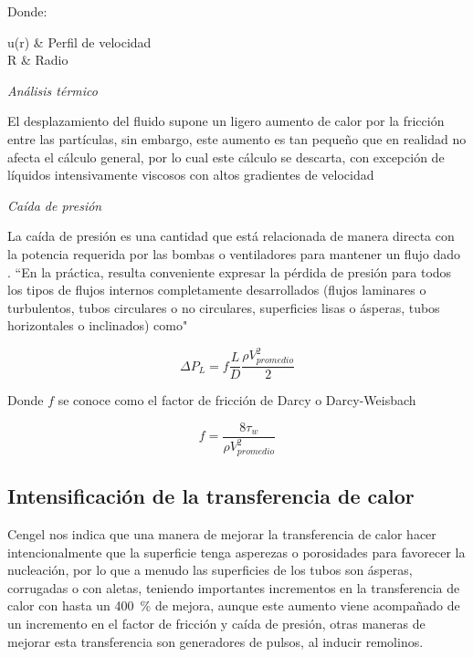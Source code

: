 				Donde:
				\begin{conditions}
					u(r) & Perfil de velocidad \\
					R & Radio
				\end{conditions}
				
				
				{\textit{Análisis térmico}}

				El desplazamiento del fluido supone un ligero aumento de calor por la fricción entre las partículas, sin embargo, este aumento es tan pequeño que en realidad no afecta el cálculo general, por lo cual este cálculo se descarta, con excepción de líquidos intensivamente viscosos con altos gradientes de velocidad

				{\textit{Caída de presión}}

				La caída de presión es una cantidad que está relacionada de manera directa con la potencia requerida por las bombas o ventiladores para mantener un flujo dado \cite{cengel_transferencia_2010}. ``En la práctica, resulta conveniente expresar la pérdida de presión para todos los tipos de flujos internos completamente desarrollados (flujos laminares o turbulentos, tubos circulares o no circulares, superficies lisas o ásperas, tubos horizontales o inclinados) como"

				\begin{equation}
					\label{equ:caida-presion}
					\Delta P_{L} = f\dfrac{L}{D}\dfrac{\rho V_{promedio}^{2}}{2}
				\end{equation}

				Donde $f$ se conoce como el factor de fricción de Darcy o Darcy-Weisbach

				\begin{equation}
					\label{equ:ff-darcy}
					f = \dfrac{8\tau_{w}}{\rho V_{promedio}^{2}}
				\end{equation}

		\subsection{Intensificación de la transferencia de calor}

			Cengel \cite{cengel_transferencia_2010} nos indica que una manera de mejorar la transferencia de calor hacer intencionalmente que la superficie tenga asperezas o porosidades para favorecer la nucleación, por lo que a menudo las superficies de los tubos son ásperas, corrugadas o con aletas, teniendo importantes incrementos en la transferencia de calor con hasta un \qty{400}{\percent} de mejora, aunque este aumento viene acompañado de un incremento en el factor de fricción y caída de presión, otras maneras de mejorar esta transferencia son generadores de pulsos, al inducir remolinos.

